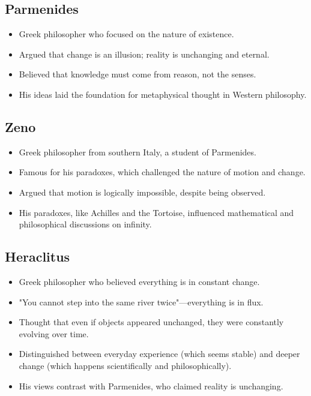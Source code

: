 \subsection{Parmenides}

\begin{itemize}
    \item Greek philosopher who focused on the nature of existence.
    \item Argued that change is an illusion; reality is unchanging and eternal.
    \item Believed that knowledge must come from reason, not the senses.
    \item His ideas laid the foundation for metaphysical thought in Western philosophy.
\end{itemize}

\subsection{Zeno}

\begin{itemize}
    \item Greek philosopher from southern Italy, a student of Parmenides.
    \item Famous for his paradoxes, which challenged the nature of motion and change.
    \item Argued that motion is logically impossible, despite being observed.
    \item His paradoxes, like Achilles and the Tortoise, influenced mathematical and philosophical discussions on infinity.
\end{itemize}

\subsection{Heraclitus}

\begin{itemize}
    \item Greek philosopher who believed everything is in constant change.
    \item "You cannot step into the same river twice"—everything is in flux.
    \item Thought that even if objects appeared unchanged, they were constantly evolving over time.
    \item Distinguished between everyday experience (which seems stable) and deeper change (which happens scientifically and philosophically).
    \item His views contrast with Parmenides, who claimed reality is unchanging.
\end{itemize}

\pagebreak